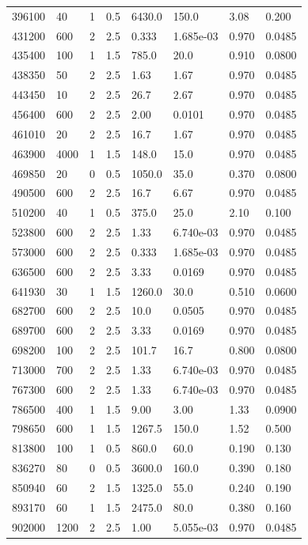 \documentclass[preview]{standalone}
\begin{document}
{{\begin{tabular}{L{1.2cm}C{1.2cm} C{0.3cm}C{0.5cm} C{1.4cm}C{1.4cm} C{1.4cm}C{1.4cm}}
  396100  &    40  & 1     & 0.5 &  6430.0  & 150.0  & 3.08 &  0.200   \\ 
  431200  &   600  & 2     & 2.5 &  0.333  & 1.685e-03  & 0.970 &  0.0485   \\ 
  435400  &   100  & 1     & 1.5 &  785.0  & 20.0  & 0.910 &  0.0800   \\ 
  438350  &    50  & 2     & 2.5 &  1.63  & 1.67  & 0.970 &  0.0485   \\ 
  443450  &    10  & 2     & 2.5 &  26.7  & 2.67  & 0.970 &  0.0485   \\ 
  456400  &   600  & 2     & 2.5 &  2.00  & 0.0101  & 0.970 &  0.0485   \\ 
  461010  &    20  & 2     & 2.5 &  16.7  & 1.67  & 0.970 &  0.0485   \\ 
  463900  &  4000  & 1     & 1.5 &  148.0  & 15.0  & 0.970 &  0.0485   \\ 
  469850  &    20  & 0     & 0.5 &  1050.0  & 35.0  & 0.370 &  0.0800   \\ 
  490500  &   600  & 2     & 2.5 &  16.7  & 6.67  & 0.970 &  0.0485   \\ 
  510200  &    40  & 1     & 0.5 &  375.0  & 25.0  & 2.10 &  0.100   \\ 
  523800  &   600  & 2     & 2.5 &  1.33  & 6.740e-03  & 0.970 &  0.0485   \\ 
  573000  &   600  & 2     & 2.5 &  0.333  & 1.685e-03  & 0.970 &  0.0485   \\ 
  636500  &   600  & 2     & 2.5 &  3.33  & 0.0169  & 0.970 &  0.0485   \\ 
  641930  &    30  & 1     & 1.5 &  1260.0  & 30.0  & 0.510 &  0.0600   \\ 
  682700  &   600  & 2     & 2.5 &  10.0  & 0.0505  & 0.970 &  0.0485   \\ 
  689700  &   600  & 2     & 2.5 &  3.33  & 0.0169  & 0.970 &  0.0485   \\ 
  698200  &   100  & 2     & 2.5 &  101.7  & 16.7  & 0.800 &  0.0800   \\ 
  713000  &   700  & 2     & 2.5 &  1.33  & 6.740e-03  & 0.970 &  0.0485   \\ 
  767300  &   600  & 2     & 2.5 &  1.33  & 6.740e-03  & 0.970 &  0.0485   \\ 
  786500  &   400  & 1     & 1.5 &  9.00  & 3.00  & 1.33 &  0.0900   \\ 
  798650  &   600  & 1     & 1.5 &  1267.5  & 150.0  & 1.52 &  0.500   \\ 
  813800  &   100  & 1     & 0.5 &  860.0  & 60.0  & 0.190 &  0.130   \\ 
  836270  &    80  & 0     & 0.5 &  3600.0  & 160.0  & 0.390 &  0.180   \\ 
  850940  &    60  & 2     & 1.5 &  1325.0  & 55.0  & 0.240 &  0.190   \\ 
  893170  &    60  & 1     & 1.5 &  2475.0  & 80.0  & 0.380 &  0.160   \\ 
  902000  &  1200  & 2     & 2.5 &  1.00  & 5.055e-03  & 0.970 &  0.0485   \\ 
\hline 
\end{tabular} 

}}
\end{document}
